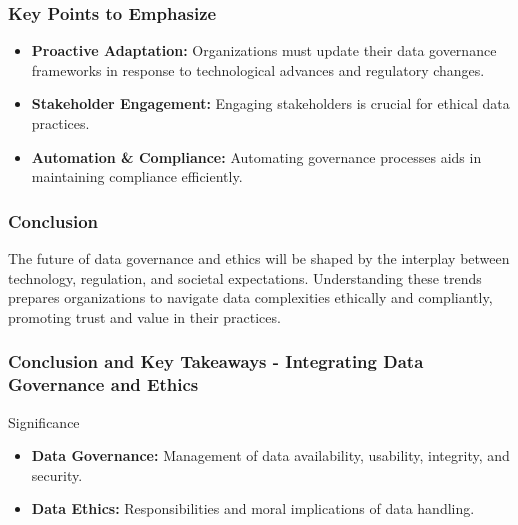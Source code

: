 \documentclass{beamer}
\begin{document}
\begin{frame}[fragile]
    \frametitle{Key Points to Emphasize}
    \begin{itemize}
        \item \textbf{Proactive Adaptation:} Organizations must update their data governance frameworks in response to technological advances and regulatory changes.
        \item \textbf{Stakeholder Engagement:} Engaging stakeholders is crucial for ethical data practices.
        \item \textbf{Automation \& Compliance:} Automating governance processes aids in maintaining compliance efficiently.
    \end{itemize}
\end{frame}

\begin{frame}[fragile]
    \frametitle{Conclusion}
    The future of data governance and ethics will be shaped by the interplay between technology, regulation, and societal expectations. Understanding these trends prepares organizations to navigate data complexities ethically and compliantly, promoting trust and value in their practices.
\end{frame}

\begin{frame}[fragile]
    \frametitle{Conclusion and Key Takeaways - Integrating Data Governance and Ethics}
    
    \begin{block}{Significance}
        \begin{itemize}
            \item \textbf{Data Governance:} Management of data availability, usability, integrity, and security.
            \item \textbf{Data Ethics:} Responsibilities and moral implications of data handling.
        \end{itemize}
    \end{block}
\end{frame}
\end{document}
